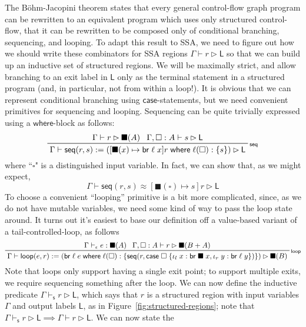 \documentclass[acmsmall,screen,review]{acmart}
\newcommand{\ms}[1]{\ensuremath{\mathsf{#1}}}
\newcommand{\lto}{:}
\newcommand{\linl}[1]{\iota_l\;{#1}}
\newcommand{\linr}[1]{\iota_r\;{#1}}
\newcommand{\brb}[2]{\ms{br}\;#1\;#2}
\newcommand{\casestmt}[5]{\ms{case}\;#1\;\{\linl{#2} \lto #3, \linr{#4} \lto #5\}}
\newcommand{\where}[2]{#1\;\ms{where}\;#2}
\newcommand{\wbranch}[3]{#1(#2) \lto \{#3\}}
\newcommand{\bhyp}[2]{#1 : #2}
\newcommand{\rle}[1]{{\scriptsize\textsf{#1}}}
\newcommand{\hasty}[4]{#1 \vdash_{#2} #3: {#4}}
\newcommand{\haslb}[3]{#1 \vdash #2 \rhd #3}
\newcommand{\shaslb}[3]{#1 \vdash_{\ms{s}} #2 \rhd #3}
\newcommand{\teqv}{\approx}
\newcommand{\lbeq}[4]{#1 \vdash #2 \teqv #3 \rhd {#4}}
\newcommand{\invar}{\square}
\newcommand{\outlb}{\blacksquare}
\begin{document}
The B\"ohm-Jacopini theorem states that every general control-flow graph program can be rewritten to
an equivalent program which uses only structured control-flow, that it can be rewritten to be
composed only of conditional branching, sequencing, and looping. To adapt this result to SSA, we
need to figure out how we should write these combinators for SSA regions $\haslb{\Gamma}{r}{\ms{L}}$
so that we can build up an inductive set of structured regions. We will be maximally strict, and
allow branching to an exit label in $\ms{L}$ only as the terminal statement in a structured program
(and, in particular, not from within a loop!). It is obvious that we can represent conditional
branching using \ms{case}-statements, but we need convenient primitives for sequencing and looping.
Sequencing can be quite trivially expressed using a \ms{where}-block as follows:
\begin{equation}
  \prftree[r]{\rle{seq}}
    {\haslb{\Gamma}{r}{\outlb(A)}}
    {\haslb{\Gamma, \bhyp{\invar}{A}}{s}{\ms{L}}}
    {\haslb{\Gamma}{\ms{seq}(r, s) 
      := (\where{[\outlb(x) \mapsto \brb{\ell}{x}]r}{\wbranch{\ell}{\invar}{s}})}{\ms{L}}}
\end{equation}
where ``$\invar$" is a distinguished input variable. In fact, we can show that, as we might expect,
\begin{equation}
  \lbeq{\Gamma}{\ms{seq}(r, s)}{[\outlb(\invar) \mapsto s]r}{\ms{L}}
\end{equation}
To choose a convenient ``looping'' primitive is a bit more complicated, since, as we do not have
mutable variables, we need some kind of way to pass the loop state around. It turns out it's easiest
to base our definition off a value-based variant of a tail-controlled-loop, as follows
\begin{equation}
  \prftree[r]{\rle{loop}}
    {\hasty{\Gamma}{\epsilon}{e}{\outlb(A)}}
    {\haslb{\Gamma, \bhyp{\invar}{A}}{r}{\outlb(B + A)}}
    {\haslb{\Gamma}{\ms{loop}(e, r) 
      := (\where{\brb{\ell}{e}}{\wbranch{\ell}{\invar}
        {\ms{seq}(r, \casestmt{\invar}{x}{\brb{\outlb}{x}}{y}{\brb{\ell}{y}})}})}{\outlb(B)}}
\end{equation}
Note that loops only support having a single exit point; to support multiple exits, we require
sequencing something after the loop. We can now define the inductive predicate
$\shaslb{\Gamma}{r}{\ms{L}}$, which says that $r$ is a structured region with input variables
$\Gamma$ and output labels $\ms{L}$, as in Figure~\ref{fig:structured-regions}; note that
$\shaslb{\Gamma}{r}{\ms{L}} \implies \haslb{\Gamma}{r}{\ms{L}}$. We can now state the
\end{document}
